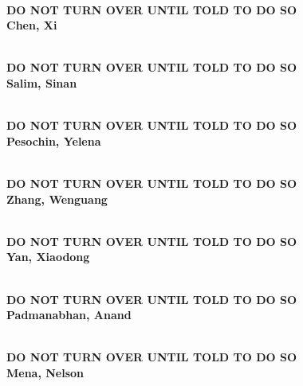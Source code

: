 \documentclass[11pt]{article}
\begin{document}
\begin{center}
{\Large\bf
\mbox{\ }\\
\vspace{1in}
DO NOT TURN OVER UNTIL TOLD TO DO SO\\
\vspace{1in}
Chen, Xi
}
\end{center}
\newpage

\begin{center}
{\Large\bf
\mbox{\ }\\
\vspace{1in}
DO NOT TURN OVER UNTIL TOLD TO DO SO\\
\vspace{1in}
Salim, Sinan
}
\end{center}
\newpage

\begin{center}
{\Large\bf
\mbox{\ }\\
\vspace{1in}
DO NOT TURN OVER UNTIL TOLD TO DO SO\\
\vspace{1in}
Pesochin, Yelena
}
\end{center}
\newpage

\begin{center}
{\Large\bf
\mbox{\ }\\
\vspace{1in}
DO NOT TURN OVER UNTIL TOLD TO DO SO\\
\vspace{1in}
Zhang, Wenguang
}
\end{center}
\newpage

\begin{center}
{\Large\bf
\mbox{\ }\\
\vspace{1in}
DO NOT TURN OVER UNTIL TOLD TO DO SO\\
\vspace{1in}
Yan, Xiaodong
}
\end{center}
\newpage

\begin{center}
{\Large\bf
\mbox{\ }\\
\vspace{1in}
DO NOT TURN OVER UNTIL TOLD TO DO SO\\
\vspace{1in}
Padmanabhan, Anand
}
\end{center}
\newpage

\begin{center}
{\Large\bf
\mbox{\ }\\
\vspace{1in}
DO NOT TURN OVER UNTIL TOLD TO DO SO\\
\vspace{1in}
Mena, Nelson
}
\end{center}
\newpage
\end{document}
